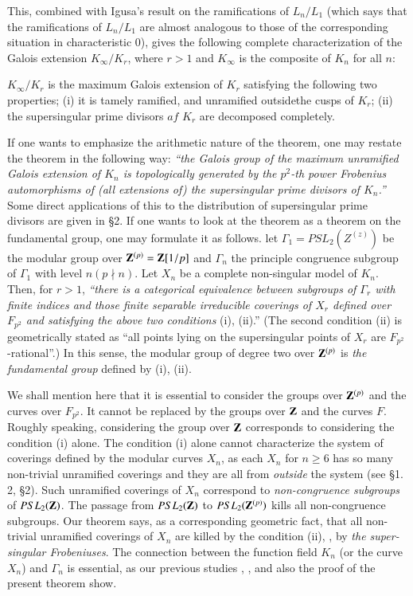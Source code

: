 This, combined with Igusa's result \cite{art6-key5} on the ramifications of $L_n/L_1$ (which says that the ramifications of $L_n/L_1$ are almost analogous to those of the corresponding situation in characteristic 0), gives the following complete characterization of the Galois extension $K_\infty/ K_r$, where $r >1$ and $K_\infty$ is the composite of $K_n$ for all $n$:

\begin{coro*}
$K_\infty/ K_r$ is the maximum Galois extension of $K_r$ satisfying the following two properties; (i) it is tamely ramified, and unramified outside\pageoriginale the cusps of $K_r$; (ii) the supersingular prime divisors $af$ $K_r$ are decomposed completely.
\end{coro*}     

If one wants to emphasize the arithmetic nature of the theorem, one may restate the theorem in the following way: \textit{``the Galois group of the maximum unramified Galois extension of $K_n$ is topologically generated by the $p^2$-th power Frobenius automorphisms of (all extensions of) the supersingular prime divisors of $K_n$.''} Some direct applications of this to the distribution of supersingular prime divisors are given in \S 2. If one wants to look at the theorem as a theorem on the fundamental group, one may formulate it as follows. let $\Gamma_1 = PSL_2 (Z^{(z)})$ be the modular group over $\mathbf{Z}^{(p)} = \mathbf{Z}[1/p]$ and $\Gamma_n$ the principle congruence subgroup of $\Gamma_1$ with level $n (p\nmid n)$. Let $X_n$ be a complete non-singular model of $K_n$. Then, for $r > 1$, \textit{``there is a categorical equivalence between subgroups of $\Gamma_r$ with finite indices and those finite separable irreducible coverings of $X_r$ defined over $F_{p^2}$ and satisfying the above two conditions} (i), (ii).'' (The second condition (ii) is geometrically stated as ``all points lying on the supersingular points of $X_r$ are $F_{p^2}$-rational''.) In this sense, the modular group of degree two over $\mathbf{Z}^{(p)}$ is \textit{the fundamental group} defined by (i), (ii).

We shall mention here that it is essential to consider the groups over $\mathbf{Z}^{(p)}$ and the curves over $F_{p^2}$. It cannot be replaced by the groups over $\mathbf{Z}$ and the curves $F$. Roughly speaking, considering the group over $\mathbf{Z}$ corresponds to considering the condition (i) alone. The condition (i) alone cannot characterize the system of coverings defined by the modular curves $X_n$, as each $X_n$ for $n \geqslant 6$ has so many non-trivial unramified coverings and they are all from \textit{outside} the system (see \S 1. 2, \S 2). Such unramified coverings of $X_n$ correspond to \textit{non-congruence subgroups} of $PSL_2 (\mathbf{Z})$. The passage from $PSL_2 (\mathbf{Z})$ to $PSL_2 (\mathbf{Z}^{(p)})$ kills all non-congruence subgroups. Our theorem says, as a corresponding geometric fact, that all non-trivial unramified coverings of $X_n$ are killed by the condition (ii), \ie, by \textit{the super-singular Frobeniuses}. The connection between the function field $K_n$ (or the curve $X_n$) and $\Gamma_n$ is essential, as our previous studies \cite{art6-key7}, \cite{art6-key8}, and also the proof of the present theorem show.

